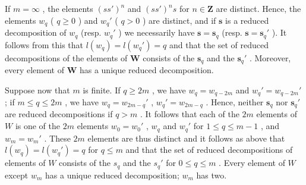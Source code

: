 If \(m = \infty\) , the elements \((ss')^n\) and \((ss')^ns\) for \(n \in \mathbf{Z}\) are distinct. Hence, the elements \(w_q\) ( \(q \geqslant 0\) ) and \(w_q'\) ( \(q > 0\) ) are distinct, and if \(\mathbf{s}\) is a reduced decomposition of \(w_q\) (resp. \(w_q'\) ) we necessarily have \(\mathbf{s} = \mathbf{s}_q\) (resp. \(\mathbf{s} = \mathbf{s}_q'\) ). It follows from this that \(l(w_q) = l(w_q') = q\) and that the set of reduced decompositions of the elements of \(\mathbf{W}\) consists of the \(\mathbf{s}_q\) and the \(\mathbf{s}_q'\) . Moreover, every element of \(\mathbf{W}\) has a unique reduced decomposition.

Suppose now that \(m\) is finite. If \(q \geqslant 2m\) , we have \(w_{q} = w_{q - 2m}\) and \(w_{q}' = w_{q - 2m}'\) ; if \(m \leqslant q \leqslant 2m\) , we have \(w_{q} = w_{2m - q}'\) , \(w_{q}' = w_{2m - q}\) . Hence, neither \(\mathbf{s}_q\) nor \(\mathbf{s}_q'\) are reduced decompositions if \(q > m\) . It follows that each of the \(2m\) elements of \(W\) is one of the \(2m\) elements \(w_0 = w_0'\) , \(w_q\) and \(w_q'\) for \(1 \leqslant q \leqslant m - 1\) , and \(w_m = w_m'\) . These \(2m\) elements are thus distinct and it follows as above that \(l(w_q) = l(w_q') = q\) for \(q \leqslant m\) and that the set of reduced decompositions of elements of \(W\) consists of the \(s_q\) and the \(s_q'\) for \(0 \leqslant q \leqslant m\) . Every element of \(W\) except \(w_m\) has a unique reduced decomposition; \(w_m\) has two.

